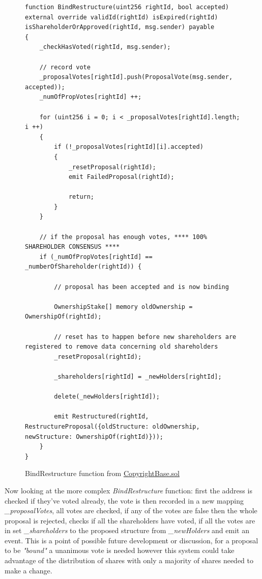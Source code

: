 \begin{figure}[H]
\caption{BindRestructure function from \href{https://github.com/MrHarrisonBarker/CRPL/blob/main/CRPL.Contracts/contracts/Copyrights/CopyrightBase.sol}{CopyrightBase.sol}}
\centering
\begin{lstlisting}[language=Solidity]
function BindRestructure(uint256 rightId, bool accepted) external override validId(rightId) isExpired(rightId) isShareholderOrApproved(rightId, msg.sender) payable 
{
	_checkHasVoted(rightId, msg.sender);
     
	// record vote
	_proposalVotes[rightId].push(ProposalVote(msg.sender, accepted));
	_numOfPropVotes[rightId] ++;

	for (uint256 i = 0; i < _proposalVotes[rightId].length; i ++) 
	{
		if (!_proposalVotes[rightId][i].accepted) 
		{
			_resetProposal(rightId);
			emit FailedProposal(rightId);

			return;
		}
	}

	// if the proposal has enough votes, **** 100% SHAREHOLDER CONSENSUS ****
	if (_numOfPropVotes[rightId] == _numberOfShareholder(rightId)) {
            
		// proposal has been accepted and is now binding

		OwnershipStake[] memory oldOwnership = OwnershipOf(rightId);
            
		// reset has to happen before new shareholders are registered to remove data concerning old shareholders
		_resetProposal(rightId);

		_shareholders[rightId] = _newHolders[rightId];

		delete(_newHolders[rightId]);

		emit Restructured(rightId, RestructureProposal({oldStructure: oldOwnership, newStructure: OwnershipOf(rightId)}));
	}
}	
\end{lstlisting}
\end{figure}

Now looking at the more complex \textit{BindRestructure} function: first the address is checked if they've voted already, the vote is then recorded in a new mapping \textit{\_proposalVotes}, all votes are checked, if any of the votes are false then the whole proposal is rejected, checks if all the shareholders have voted, if all the votes are in set \textit{\_shareholders} to the proposed structure from \textit{\_newHolders} and emit an event.
\br
This is a point of possible future development or discussion, for a proposal to be \textit{"bound"} a unanimous vote is needed however this system could take advantage of the distribution of shares with only a majority of shares needed to make a change.

